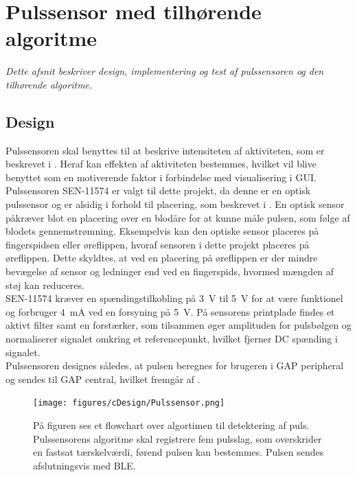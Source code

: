 \section{Pulssensor med tilhørende algoritme}\label{sec_de_im_te_puls}
\textit{Dette afsnit beskriver design, implementering og test af pulssensoren og den tilhørende algoritme.}

\subsection{Design} \label{sec_design_puls}
Pulssensoren skal benyttes til at beskrive intensiteten af aktiviteten, som er beskrevet i . Heraf kan effekten af aktiviteten bestemmes, hvilket vil blive benyttet som en motiverende faktor i forbindelse med visualisering i GUI. \newline
Pulssensoren SEN-11574 er valgt til dette projekt, da denne er en optisk pulssensor og er alsidig i forhold til placering, som beskrevet i . En optisk sensor påkræver blot en placering over en blodåre for at kunne måle pulsen, som følge af blodets gennemstrømning. Eksempelvis kan den optiske sensor placeres på fingerspidsen eller øreflippen, hvoraf sensoren i dette projekt placeres på øreflippen. Dette skyldtes, at ved en placering på øreflippen er der mindre bevægelse af sensor og ledninger end ved en fingerspids, hvormed mængden af støj kan reduceres. \\
SEN-11574 kræver en spændingstilkobling på 3~V til 5~V for at være funktionel og forbruger 4~mA ved en forsyning på 5~V. På sensorens printplade findes et aktivt filter samt en forstærker, som tilsammen øger amplituden for pulsbølgen og normaliserer signalet omkring et referencepunkt, hvilket fjerner DC spænding i signalet. \citep{Murphy2016,Murphy2016_sensor}\\
Pulssensoren designes således, at pulsen beregnes for brugeren i GAP peripheral og sendes til GAP central, hvilket fremgår af .
\begin{figure}[H]
	\centering
	\texttt{[image: figures/cDesign/Pulssensor.png]}
	\caption{På figuren ses et flowchart over algortimen til detektering af puls. Pulssensorens algoritme skal registrere fem pulsslag, som overskrider en fastsat tærskelværdi, førend pulsen kan bestemmes. Pulsen sendes afslutningsvis med BLE.}
	\label{fig:puls_pseudo}
\end{figure}\vspace{-.25cm}
